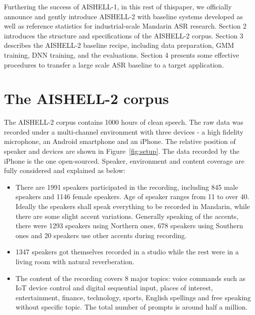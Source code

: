 \documentclass[a4paper]{article}
\begin{document}
Furthering the success of AISHELL-1, in this rest of thispaper, we officially announce and gently introduce AISHELL-2 with baseline systems developed as well as reference statistics for industrial-scale Mandarin ASR research.
%
Section 2 introduces the structure and specifications of the AISHELL-2 corpus. Section 3 describes the AISHELL-2
baseline recipe, including data preparation, GMM training, DNN training, and the
evaluations. Section 4 presents some effective procedures to transfer a large
scale ASR baseline to a target application.

\section{The AISHELL-2 corpus}

The AISHELL-2 corpus contains 1000 hours of clean speech. The raw data was recorded under a multi-channel environment with three devices - a high fidelity microphone, an Android smartphone and an iPhone. The relative position of speaker and devices are shown in Figure~\ref{fig:setup}. The data recorded by the iPhone is the one open-sourced. Speaker, environment and content coverage are fully considered and explained as below:
\begin{itemize}
\item There are 1991 speakers participated in the recording, including 845 male speakers and 1146 female speakers. Age of speaker ranges from 11 to over 40. Ideally the speakers shall speak everything to be recorded in Mandarin, while there are some slight accent variations. Generally speaking of the accents, there were 1293 speakers using Northern ones, 678 speakers using Southern ones and 20 speakers use other accents during recording. 
\item 1347 speakers got themselves recorded in a studio while the rest were in a living room with natural reverberation.
\item The content of the recording covers 8 major topics: voice commands such as IoT device control and digital sequential input, places of interest, entertainment, finance, technology, sports, English spellings and free speaking without specific topic. The total number of prompts is around half a million.
\end{itemize}
\end{document}
